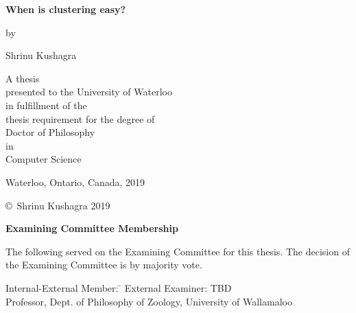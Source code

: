\documentclass[letterpaper,12pt,titlepage,oneside,final]{book}
\let\origdoublepage\cleardoublepage
\newcommand{\clearemptydoublepage}{%
  \clearpage{\pagestyle{empty}\origdoublepage}}
\let\cleardoublepage\clearemptydoublepage
\begin{document}
\fi
\pagestyle{empty}

\begin{titlepage}
        \begin{center}
        \vspace*{1.0cm}

        \Huge
        {\bf When is clustering easy? }

        \vspace*{1.0cm}

        \normalsize
        by \\

        \vspace*{1.0cm}

        \Large
        Shrinu Kushagra \\

        \vspace*{3.0cm}

        \normalsize
        A thesis \\
        presented to the University of Waterloo \\ 
        in fulfillment of the \\
        thesis requirement for the degree of \\
        Doctor of Philosophy \\
        in \\
        Computer Science \\

        \vspace*{2.0cm}

        Waterloo, Ontario, Canada, 2019 \\

        \vspace*{1.0cm}

        \copyright\ Shrinu Kushagra 2019 \\
        \end{center}
\end{titlepage}

\pagestyle{plain}
\setcounter{page}{2}

\cleardoublepage
\begin{center}\textbf{Examining Committee Membership}\end{center}
  \noindent
The following served on the Examining Committee for this thesis. The decision of the Examining Committee is by majority vote.
  \bigskip
  
  \noindent
\begin{tabbing}
Internal-External Member: \=  \kill %
External Examiner: \>  TBD \\ 
\> Professor, Dept. of Philosophy of Zoology, University of Wallamaloo \\
\end{tabbing} 
  \bigskip
  
\end{document}
